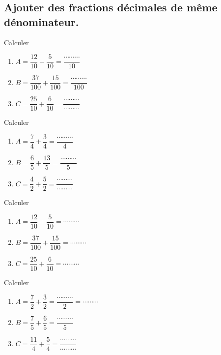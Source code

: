 \subsection{Ajouter des fractions décimales de même dénominateur.}



Calculer

\begin{enumerate}
\item $A = \dfrac{12}{10} +\dfrac{5}{10} = \dfrac{\cdots\cdots\cdots }{10}  $
\item $B = \dfrac{37}{100} +\dfrac{15}{100} = \dfrac{\cdots\cdots\cdots }{100}  $
\item $C = \dfrac{25}{10} +\dfrac{6}{10} = \dfrac{\cdots\cdots\cdots }{\cdots\cdots\cdots } $
\end{enumerate}




Calculer

\begin{enumerate}
\item $A = \dfrac{7}{4} +\dfrac{3}{4} = \dfrac{\cdots\cdots\cdots }{4}  $
\item $B = \dfrac{6}{5} +\dfrac{13}{5} = \dfrac{\cdots\cdots\cdots }{5}  $
\item $C = \dfrac{4}{2} +\dfrac{5}{2} = \dfrac{\cdots\cdots\cdots }{\cdots\cdots\cdots } $
\end{enumerate}






Calculer

\begin{enumerate}
\item $A = \dfrac{12}{10} +\dfrac{5}{10} =  \cdots\cdots\cdots  $
\item $B = \dfrac{37}{100} +\dfrac{15}{100} =  \cdots\cdots\cdots  $
\item $C = \dfrac{25}{10} +\dfrac{6}{10} =  \cdots\cdots\cdots $
\end{enumerate}




Calculer

\begin{enumerate}
\item $A = \dfrac{7}{2} +\dfrac{3}{2} = \dfrac{\cdots\cdots\cdots }{2} =  \cdots\cdots\cdots  $
\item $B = \dfrac{7}{5} +\dfrac{6}{5} = \dfrac{\cdots\cdots\cdots }{5} $
\item $C = \dfrac{11}{4} +\dfrac{5}{4} = \dfrac{\cdots\cdots\cdots }{\cdots\cdots\cdots } $
\end{enumerate}





